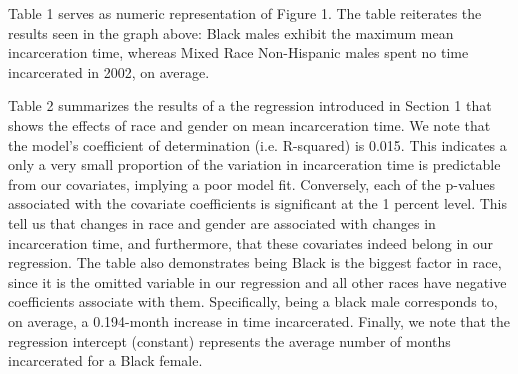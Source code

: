 \documentclass{article}
\begin{document}


Table 1 serves as numeric representation of Figure 1. The table reiterates the results seen in the graph above: Black males exhibit the maximum mean incarceration time, whereas Mixed Race Non-Hispanic males spent no time incarcerated in 2002, on average.



Table 2 summarizes the results of a the regression introduced in Section 1 that shows the effects of race and gender on mean incarceration time. We note that the model's coefficient of determination (i.e. R-squared) is 0.015. This indicates a only a very small proportion of the variation in incarceration time is predictable from our covariates, implying a poor model fit. Conversely, each of the p-values associated with the covariate coefficients is significant at the 1 percent level. This tell us that changes in race and gender are associated with changes in incarceration time, and furthermore, that these covariates indeed belong in our regression. The table also demonstrates being Black is the biggest factor in race, since it is the omitted variable in our regression and all other races have negative coefficients associate with them. Specifically, being a black male corresponds to, on average, a 0.194-month increase in time incarcerated. Finally, we note that the regression intercept (constant) represents the average number of months incarcerated for a Black female.
\end{document}

